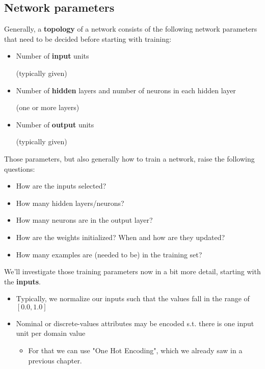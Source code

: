 \subsection{Network parameters}
Generally, a \textbf{topology} of a network consists of the following network parameters that need to be decided before starting with training:
\begin{itemize}
  \item Number of \textbf{input} units \begin{note}(typically given)\end{note}
  \item Number of \textbf{hidden} layers and number of neurons in each hidden layer \begin{note}(one or more layers)\end{note}
  \item Number of \textbf{output} units \begin{note}(typically given)\end{note}
\end{itemize}

Those parameters, but also generally how to train a network, raise the following questions:
\begin{itemize}
  \item How are the inputs selected?
  \item How many hidden layers/neurons?
  \item How many neurons are in the output layer?
  \item How are the weights initialized? When and how are they updated?
  \item How many examples are (needed to be) in the training set?
\end{itemize}

We'll investigate those training parameters now in a bit more detail, starting with the \textbf{inputs}. 
\begin{itemize}
  \item Typically, we normalize our inputs such that the values fall in the range of $[0.0, 1.0]$
  \item Nominal or discrete-values attributes may be encoded s.t. there is one input unit per domain value
  \begin{itemize}
    \item For that we can use "One Hot Encoding", which we already saw in a previous chapter.
  \end{itemize}
\end{itemize}

